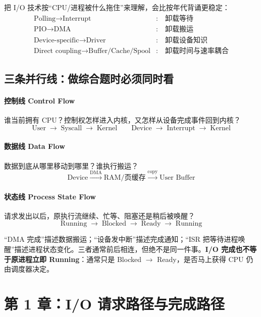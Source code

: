 \documentclass[UTF8,fontset=fandol,11pt,a4paper]{ctexart}
\newcommand{\kw}[1]{\textbf{#1}}
\newcommand{\arr}{\;\longrightarrow\;}
\begin{document}
\begin{bridge}[I/O 的四次“卸载”]
把 I/O 技术按“CPU/进程被什么拖住”来理解，会比按年代背诵更稳定：
\[
\boxed{
\begin{aligned}
\text{Polling}\to\text{Interrupt} &:\quad \text{卸载等待}\\
\text{PIO}\to\text{DMA} &:\quad \text{卸载搬运}\\
\text{Device-specific}\to\text{Driver} &:\quad \text{卸载设备知识}\\
\text{Direct coupling}\to\text{Buffer/Cache/Spool} &:\quad \text{卸载时间与速率耦合}
\end{aligned}}
\]
\end{bridge}

\subsection{三条并行线：做综合题时必须同时看}

\paragraph{控制线 Control Flow}
谁当前拥有 CPU？控制权怎样进入内核，又怎样从设备完成事件回到内核？
\[
\text{User}\arr\text{Syscall}\arr\text{Kernel}\qquad
\text{Device}\arr\text{Interrupt}\arr\text{Kernel}
\]

\paragraph{数据线 Data Flow}
数据到底从哪里移动到哪里？谁执行搬运？
\[
\text{Device}\xrightarrow{\text{DMA}}\text{RAM/页缓存}
\xrightarrow{\text{copy}}\text{User Buffer}
\]

\paragraph{状态线 Process State Flow}
请求发出以后，原执行流继续、忙等、阻塞还是稍后被唤醒？
\[
\text{Running}\arr\text{Blocked}\arr\text{Ready}\arr\text{Running}
\]

\begin{warn}[三条线最常见的混淆]
“DMA 完成”描述数据搬运；“设备发中断”描述完成通知；“ISR 把等待进程唤醒”描述进程状态变化。三者通常前后相连，但绝不是同一件事。\kw{I/O 完成也不等于原进程立即 Running}：通常只是 Blocked $\to$ Ready，是否马上获得 CPU 仍由调度器决定。
\end{warn}

\section{第 1 章：I/O 请求路径与完成路径}
\end{document}
